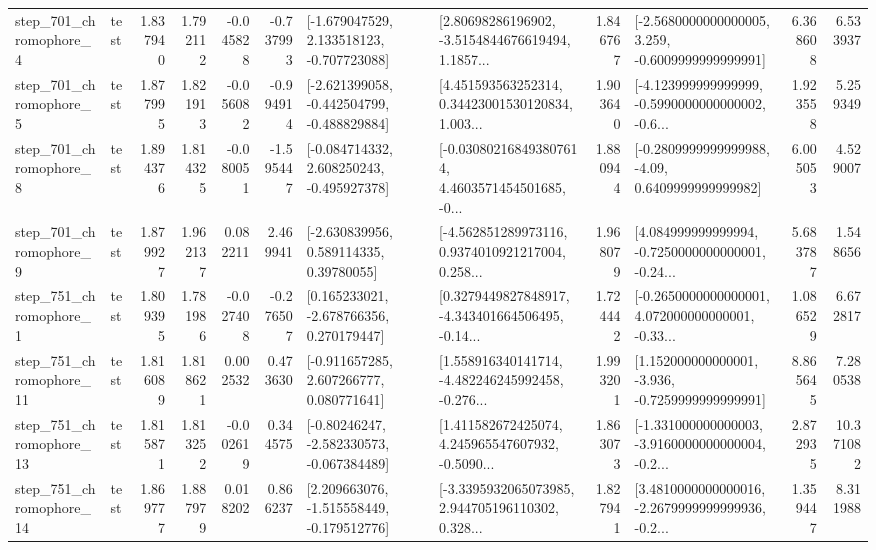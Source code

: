 \begin{tabular}{llrrrrllrlrr}
   step\_701\_chromophore\_4 &      test &      1.837940 &    1.792112 &     -0.045828 & -0.737993 &   [-1.679047529, 2.133518123, -0.707723088] &  [2.80698286196902, -3.5154844676619494, 1.1857... &       1.846767 &  [-2.5680000000000005, 3.259, -0.6009999999999991] &            6.368608 &          6.533937 \\
   step\_701\_chromophore\_5 &      test &      1.877995 &    1.821913 &     -0.056082 & -0.994914 &  [-2.621399058, -0.442504799, -0.488829884] &  [4.451593563252314, 0.34423001530120834, 1.003... &       1.903640 &  [-4.123999999999999, -0.5990000000000002, -0.6... &            1.923558 &          5.259349 \\
   step\_701\_chromophore\_8 &      test &      1.894376 &    1.814325 &     -0.080051 & -1.595447 &   [-0.084714332, 2.608250243, -0.495927378] &  [-0.030802168493807614, 4.4603571454501685, -0... &       1.880944 &   [-0.2809999999999988, -4.09, 0.6409999999999982] &            6.005053 &          4.529007 \\
   step\_701\_chromophore\_9 &      test &      1.879927 &    1.962137 &      0.082211 &  2.469941 &     [-2.630839956, 0.589114335, 0.39780055] &  [-4.562851289973116, 0.9374010921217004, 0.258... &       1.968079 &  [4.084999999999994, -0.7250000000000001, -0.24... &            5.683787 &          1.548656 \\
   step\_751\_chromophore\_1 &      test &      1.809395 &    1.781986 &     -0.027408 & -0.276507 &    [0.165233021, -2.678766356, 0.270179447] &  [0.3279449827848917, -4.343401664506495, -0.14... &       1.724442 &  [-0.2650000000000001, 4.072000000000001, -0.33... &            1.086529 &          6.672817 \\
  step\_751\_chromophore\_11 &      test &      1.816089 &    1.818621 &      0.002532 &  0.473630 &    [-0.911657285, 2.607266777, 0.080771641] &  [1.558916340141714, -4.482246245992458, -0.276... &       1.993201 &   [1.152000000000001, -3.936, -0.7259999999999991] &            8.865645 &          7.280538 \\
  step\_751\_chromophore\_13 &      test &      1.815871 &    1.813252 &     -0.002619 &  0.344575 &   [-0.80246247, -2.582330573, -0.067384489] &  [1.411582672425074, 4.245965547607932, -0.5090... &       1.863073 &  [-1.331000000000003, -3.9160000000000004, -0.2... &            2.872935 &         10.371082 \\
  step\_751\_chromophore\_14 &      test &      1.869777 &    1.887979 &      0.018202 &  0.866237 &   [2.209663076, -1.515558449, -0.179512776] &  [-3.3395932065073985, 2.944705196110302, 0.328... &       1.827941 &  [3.4810000000000016, -2.2679999999999936, -0.2... &            1.359447 &          8.311988 \\

\end{tabular}
